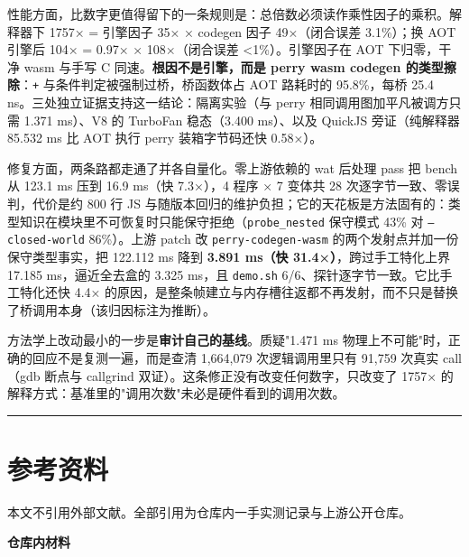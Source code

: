 \documentclass[11pt, a4paper]{article}
\begin{document}
性能方面，比数字更值得留下的一条规则是：总倍数必须读作乘性因子的乘积。解释器下 1757× = 引擎因子 35× × codegen 因子 49×（闭合误差 3.1\%）；换 AOT 引擎后 104× = 0.97× × 108×（闭合误差 <1\%）。引擎因子在 AOT 下归零，干净 wasm 与手写 C 同速。\textbf{根因不是引擎，而是 perry wasm codegen 的类型擦除}：\texttt{+} 与条件判定被强制过桥，桥函数体占 AOT 路耗时的 95.8\%，每桥 25.4 ns。三处独立证据支持这一结论：隔离实验（与 perry 相同调用图加平凡被调方只需 1.371 ms）、V8 的 TurboFan 稳态（3.400 ms）、以及 QuickJS 旁证（纯解释器 85.532 ms 比 AOT 执行 perry 装箱字节码还快 0.58×）。


修复方面，两条路都走通了并各自量化。零上游依赖的 wat 后处理 pass 把 bench 从 123.1 ms 压到 16.9 ms（快 7.3×），4 程序 × 7 变体共 28 次逐字节一致、零误判，代价是约 800 行 JS 与随版本回归的维护负担；它的天花板是方法固有的：类型知识在模块里不可恢复时只能保守拒绝（\texttt{probe\_nested} 保守模式 43\% 对 \texttt{--closed-world} 86\%）。上游 patch 改 \texttt{perry-codegen-wasm} 的两个发射点并加一份保守类型事实，把 122.112 ms 降到 \textbf{3.891 ms（快 31.4×）}，跨过手工特化上界 17.185 ms，逼近全去盒的 3.325 ms，且 \texttt{demo.sh} 6/6、探针逐字节一致。它比手工特化还快 4.4× 的原因，是整条帧建立与内存槽往返都不再发射，而不只是替换了桥调用本身（该归因标注为推断）。


方法学上改动最小的一步是\textbf{审计自己的基线}。质疑"1.471 ms 物理上不可能"时，正确的回应不是复测一遍，而是查清 1,664,079 次逻辑调用里只有 91,759 次真实 call（gdb 断点与 callgrind 双证）。这条修正没有改变任何数字，只改变了 1757× 的解释方式：基准里的"调用次数"未必是硬件看到的调用次数。


\bigskip\hrule\bigskip

\section{参考资料}

本文不引用外部文献。全部引用为仓库内一手实测记录与上游公开仓库。


\textbf{仓库内材料}
\end{document}
